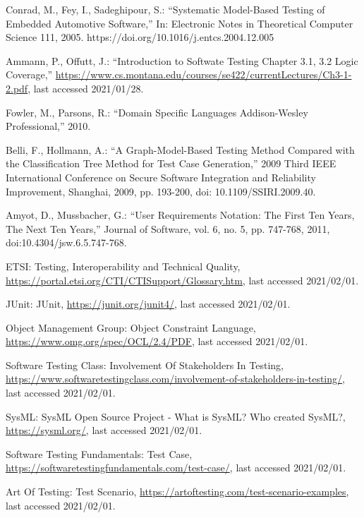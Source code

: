 \documentclass[a4paper,10pt, bibliography=totocnumbered]{scrreprt}
\begin{document}
\begin{thebibliography}{9}
 Conrad, M., Fey, I., Sadeghipour, S.: \enquote{Systematic Model-Based Testing of Embedded Automotive Software,} 
In: Electronic Notes in Theoretical Computer Science 111, 2005.
https://doi.org/10.1016/j.entcs.2004.12.005

 Ammann, P., Offutt, J.: \enquote{Introduction to Softwate Testing Chapter 3.1, 3.2 Logic Coverage,} \url{https://www.cs.montana.edu/courses/se422/currentLectures/Ch3-1-2.pdf}, last accessed 2021/01/28.

 Fowler, M., Parsons, R.: \enquote{Domain Specific Languages
Addison-Wesley Professional,} 2010.

 Belli, F., Hollmann, A.: \enquote{A Graph-Model-Based Testing Method Compared with the Classification Tree Method for Test Case Generation,} 2009 Third IEEE International Conference on Secure Software Integration and Reliability Improvement, Shanghai, 2009, pp. 193-200, doi: 10.1109/SSIRI.2009.40.

 Amyot, D., Mussbacher, G.: \enquote{User Requirements Notation: The First Ten Years, The Next Ten Years,} Journal of Software, vol. 6, no. 5, pp. 747-768, 2011, doi:10.4304/jsw.6.5.747-768.

 ETSI: Testing, Interoperability and Technical Quality, \url{https://portal.etsi.org/CTI/CTISupport/Glossary.htm}, last accessed 2021/02/01.

 JUnit: JUnit, \url{https://junit.org/junit4/}, last accessed 2021/02/01.

 Object Management Group: Object Constraint Language, \url{https://www.omg.org/spec/OCL/2.4/PDF}, last accessed 2021/02/01.

 Software Testing Class: Involvement Of Stakeholders In Testing, \url{https://www.softwaretestingclass.com/involvement-of-stakeholders-in-testing/}, last accessed 2021/02/01.

 SysML: SysML Open Source Project - What is SysML? Who created SysML?, \url{https://sysml.org/}, last accessed 2021/02/01.

 Software Testing Fundamentals: Test Case, \url{https://softwaretestingfundamentals.com/test-case/}, last accessed 2021/02/01.

 Art Of Testing: Test Scenario, \url{https://artoftesting.com/test-scenario-examples}, last accessed 2021/02/01.


\end{thebibliography}
\end{document}
